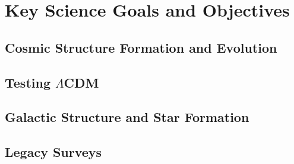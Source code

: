 \documentclass[12pt]{article}
\begin{document}
\vspace{-0.04in}



\vspace{-0.07in}

\section{Key Science Goals and Objectives}
\label{sec:science}

\vspace{-0.06in}




\vspace{-0.06in}

\subsection{Cosmic Structure Formation and Evolution} %
\label{sec:extragalacticsci}

\vspace{-0.03in}





\subsection{Testing $\Lambda$CDM} %
\label{sec:testinglcdm}




\vspace{-0.06in}

\subsection{Galactic Structure and Star Formation} %
\label{sec:galacticsci}





\subsection{Legacy Surveys} %
\label{sec:legacy}
\end{document}
